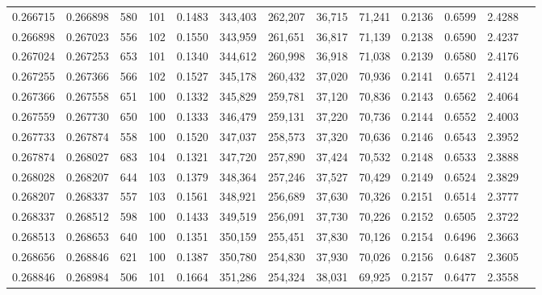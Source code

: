 \begin{tabular}{rrrrrrrrrrrrr}
0.266715 & 0.266898 &   580 & 101 &                                     0.1483 & 343,403 & 262,207 &  36,715 &  71,241 & 0.2136 & 0.6599 & 2.4288 \\
0.266898 & 0.267023 &   556 & 102 &                                     0.1550 & 343,959 & 261,651 &  36,817 &  71,139 & 0.2138 & 0.6590 & 2.4237 \\
0.267024 & 0.267253 &   653 & 101 &                                     0.1340 & 344,612 & 260,998 &  36,918 &  71,038 & 0.2139 & 0.6580 & 2.4176 \\
0.267255 & 0.267366 &   566 & 102 &                                     0.1527 & 345,178 & 260,432 &  37,020 &  70,936 & 0.2141 & 0.6571 & 2.4124 \\
0.267366 & 0.267558 &   651 & 100 &                                     0.1332 & 345,829 & 259,781 &  37,120 &  70,836 & 0.2143 & 0.6562 & 2.4064 \\
0.267559 & 0.267730 &   650 & 100 &                                     0.1333 & 346,479 & 259,131 &  37,220 &  70,736 & 0.2144 & 0.6552 & 2.4003 \\
0.267733 & 0.267874 &   558 & 100 &                                     0.1520 & 347,037 & 258,573 &  37,320 &  70,636 & 0.2146 & 0.6543 & 2.3952 \\
0.267874 & 0.268027 &   683 & 104 &                                     0.1321 & 347,720 & 257,890 &  37,424 &  70,532 & 0.2148 & 0.6533 & 2.3888 \\
0.268028 & 0.268207 &   644 & 103 &                                     0.1379 & 348,364 & 257,246 &  37,527 &  70,429 & 0.2149 & 0.6524 & 2.3829 \\
0.268207 & 0.268337 &   557 & 103 &                                     0.1561 & 348,921 & 256,689 &  37,630 &  70,326 & 0.2151 & 0.6514 & 2.3777 \\
0.268337 & 0.268512 &   598 & 100 &                                     0.1433 & 349,519 & 256,091 &  37,730 &  70,226 & 0.2152 & 0.6505 & 2.3722 \\
0.268513 & 0.268653 &   640 & 100 &                                     0.1351 & 350,159 & 255,451 &  37,830 &  70,126 & 0.2154 & 0.6496 & 2.3663 \\
0.268656 & 0.268846 &   621 & 100 &                                     0.1387 & 350,780 & 254,830 &  37,930 &  70,026 & 0.2156 & 0.6487 & 2.3605 \\
0.268846 & 0.268984 &   506 & 101 &                                     0.1664 & 351,286 & 254,324 &  38,031 &  69,925 & 0.2157 & 0.6477 & 2.3558 \\

\end{tabular}
